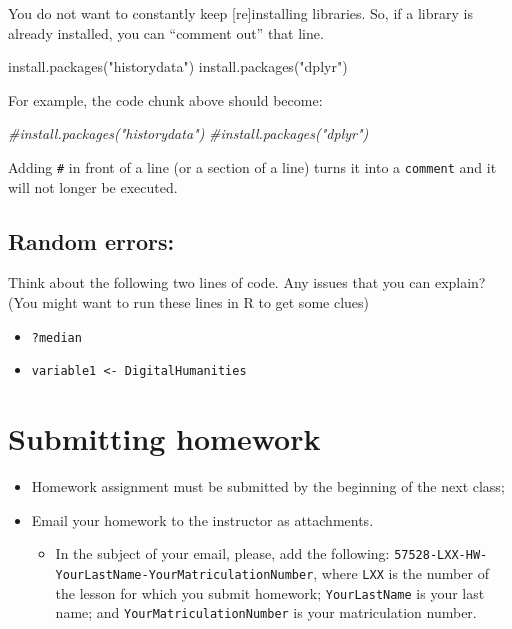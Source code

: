 \documentclass[
]{book}
\newenvironment{Shaded}{\begin{snugshade}}{\end{snugshade}}
\newcommand{\CommentTok}[1]{\textcolor[rgb]{0.56,0.35,0.01}{\textit{#1}}}
\newcommand{\FunctionTok}[1]{\textcolor[rgb]{0.00,0.00,0.00}{#1}}
\newcommand{\NormalTok}[1]{#1}
\newcommand{\StringTok}[1]{\textcolor[rgb]{0.31,0.60,0.02}{#1}}
\providecommand{\tightlist}{%
  \setlength{\itemsep}{0pt}\setlength{\parskip}{0pt}}
\begin{document}
You do not want to constantly keep {[}re{]}installing libraries. So, if a library is already installed, you can ``comment out'' that line.

\begin{Shaded}
\begin{Highlighting}[]
\FunctionTok{install.packages}\NormalTok{(}\StringTok{"historydata"}\NormalTok{)}
\FunctionTok{install.packages}\NormalTok{(}\StringTok{"dplyr"}\NormalTok{)}
\end{Highlighting}
\end{Shaded}

For example, the code chunk above should become:

\begin{Shaded}
\begin{Highlighting}[]
\CommentTok{\#install.packages("historydata")}
\CommentTok{\#install.packages("dplyr")}
\end{Highlighting}
\end{Shaded}

Adding \texttt{\#} in front of a line (or a section of a line) turns it into a \texttt{comment} and it will not longer be executed.

\hypertarget{random-errors}{%
\subsection{Random errors:}\label{random-errors}}

Think about the following two lines of code. Any issues that you can explain? (You might want to run these lines in R to get some clues)

\begin{itemize}
\tightlist
\item
  \texttt{\textasciigrave{}?median\textasciigrave{}}
\item
  \texttt{variable1\ \textless{}-\ DigitalHumanities}
\end{itemize}

\hypertarget{L01_SHW}{%
\section{Submitting homework}\label{L01_SHW}}

\begin{itemize}
\tightlist
\item
  Homework assignment must be submitted by the beginning of the next class;
\item
  Email your homework to the instructor as attachments.

  \begin{itemize}
  \tightlist
  \item
    In the subject of your email, please, add the following: \texttt{57528-LXX-HW-YourLastName-YourMatriculationNumber}, where \texttt{LXX} is the number of the lesson for which you submit homework; \texttt{YourLastName} is your last name; and \texttt{YourMatriculationNumber} is your matriculation number.
  \end{itemize}
\end{itemize}
\end{document}
